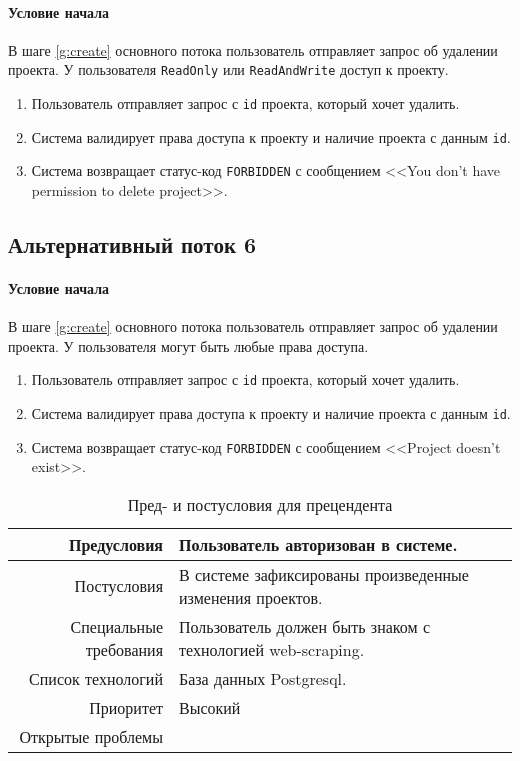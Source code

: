 \documentclass[a4paper,12pt]{article}
\begin{document}
\paragraph*{Условие начала} В шаге \ref{g:create} основного потока пользователь отправляет запрос об удалении проекта. У пользователя \texttt{ReadOnly} или \texttt{ReadAndWrite} доступ к проекту.

\begin{enumerate}
    \def\labelenumi{\arabic{enumi}.}
    \item Пользователь отправляет запрос с \texttt{id} проекта, который хочет удалить.
    \item Система валидирует права доступа к проекту и наличие проекта с данным \texttt{id}.
    \item Система возвращает статус-код \texttt{FORBIDDEN} с сообщением <<You don't have permission to delete project>>.
\end{enumerate}

\subsection*{Альтернативный поток 6}

\paragraph*{Условие начала} В шаге \ref{g:create} основного потока пользователь отправляет запрос об удалении проекта. У пользователя могут быть любые права доступа.

\begin{enumerate}
    \def\labelenumi{\arabic{enumi}.}
    \item Пользователь отправляет запрос с \texttt{id} проекта, который хочет удалить.
    \item Система валидирует права доступа к проекту и наличие проекта с данным \texttt{id}.
    \item Система возвращает статус-код \texttt{FORBIDDEN} с сообщением <<Project doesn't exist>>.
\end{enumerate}


\begin{longtable}[]{|@{\textbf}r|p{7cm}|} 
\caption{Пред- и постусловия для прецендента}
\hline
    Предусловия            &  Пользователь авторизован в системе. \\ \hline
    Постусловия            & В системе зафиксированы произведенные изменения проектов.                                                                          \\ \hline
    Специальные требования & Пользователь должен быть знаком с технологией web-scraping. \\ \hline
    Список технологий      & База данных Postgresql.   \\ \hline
    Приоритет              & Высокий \\ \hline
    Открытые проблемы      &                                                                                                                                    \\ \hline
\end{longtable}
\end{document}
